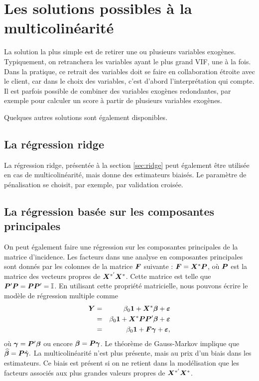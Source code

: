 \section{Les solutions possibles à la multicolinéarité}
\label{sec:solutionsMulticolinearite}

La solution la plus simple est de retirer une ou plusieurs variables exogènes. Typiquement, on retranchera les variables ayant le plus grand VIF, une à la fois. Dans la pratique, ce retrait des variables doit se faire en collaboration étroite avec le client, car dans le choix des variables, c'est d'abord l'interprétation qui compte. Il est parfois possible  de combiner des variables exogènes redondantes, par exemple pour calculer un score à partir de plusieurs variables exogènes.

Quelques autres solutions sont également disponibles.



\subsection{La régression \og ridge \fg}

La régression ridge, présentée à la section \ref{sec:ridge} peut également être utilisée en cas de multicolinéarité, mais donne des estimateurs biaisés. Le paramètre de pénalisation se choisit, par exemple, par validation croisée.


\subsection{La régression basée sur les composantes principales}


On peut également faire une régression sur les composantes principales de la matrice d'incidence. Les facteurs dans une analyse en composantes principales sont donnés par les colonnes de la matrice ${\bm{F}}$ suivante :
${\bm{F}}=\bm{X}^*{\bm{P}}$,
où ${\bm{P}}$ est la matrice des vecteurs propres de $\bm{X}^{*'}\bm{X}^*$. Cette matrice est telle que ${\bm{P}}'{\bm{P}}={\bm{P}}{\bm{P}}'=\bm{\mathbb{I}}$. En utilisant cette propriété matricielle, nous pouvons écrire le modèle de régression multiple comme
\begin{eqnarray*}
\bm{Y} & = & \beta_0{\bm{1}}+\bm{X}^*\bm\beta + \bm\varepsilon \\
 & = & \beta_0{\bm{1}}+\bm{X}^*{\bm{P}}{\bm{P}}'\bm\beta+ \bm\varepsilon\\
& = & \beta_0{\bm{1}}+{\bm{F}}{\bm{\gamma}}+\bm\varepsilon,
\end{eqnarray*}
où ${\bm{\gamma}}={\bm{P}}'\bm\beta$ ou encore $\bm\beta={\bm{P}}{\bm{\gamma}}$. Le théorème de Gauss-Markov implique que $\widehat{\bm\beta}={\bm{P}}\hat{{\bm{\gamma}}}.$
La multicolinéarité n'est plus présente, mais au prix d'un biais dans les estimateurs. Ce biais est présent si on ne retient dans la modélisation que les facteurs associés aux plus grandes valeurs propres de $\bm{X}^{*'}\bm{X}^*$.

